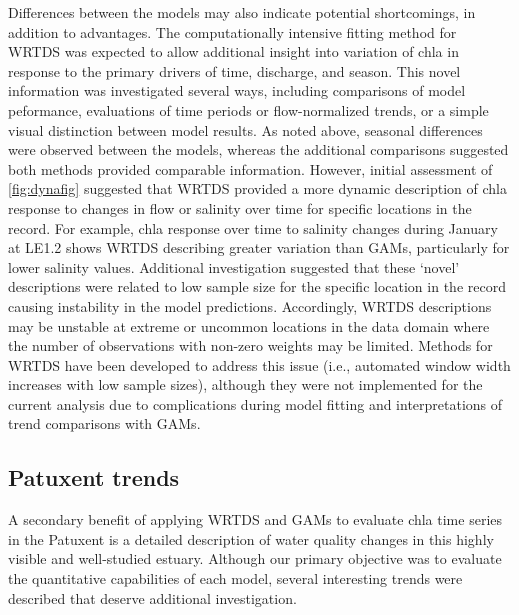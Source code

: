 \documentclass[letterpaper,12pt,oneside]{article}\usepackage[]{graphicx}\usepackage[]{color}
\begin{document}
Differences between the models may also indicate potential shortcomings, in addition to advantages.  The computationally intensive fitting method for \ac{WRTDS} was expected to allow additional insight into variation of \ac{chla} in response to the primary drivers of time, discharge, and season.  This novel information was investigated several ways, including comparisons of model peformance, evaluations of time periods or flow-normalized trends, or a simple visual distinction between model results.  As noted above, seasonal differences were observed between the models, whereas the additional comparisons suggested both methods provided comparable information.  However, initial assessment of \cref{fig:dynafig} suggested that \ac{WRTDS} provided a more dynamic description of \ac{chla} response to changes in flow or salinity over time for specific locations in the record.  For example, \ac{chla} response over time to salinity changes during January at LE1.2 shows \ac{WRTDS} describing greater variation than \acp{GAM}, particularly for lower salinity values.  Additional investigation suggested that these `novel' descriptions were related to low sample size for the specific location in the record causing instability in the model predictions.   Accordingly, \ac{WRTDS} descriptions may be unstable at extreme or uncommon locations in the data domain where the number of observations with non-zero weights may be limited.  Methods for \ac{WRTDS} have been developed to address this issue (i.e., automated window width increases with low sample sizes), although they were not implemented for the current analysis due to complications during model fitting and interpretations of trend comparisons with \acp{GAM}.    

\subsection{Patuxent trends}

A secondary benefit of applying \ac{WRTDS} and \acp{GAM} to evaluate \ac{chla} time series in the Patuxent is a detailed description of water quality changes in this highly visible and well-studied estuary.  Although our primary objective was to evaluate the quantitative capabilities of each model, several interesting trends were described that deserve additional investigation.   

\end{document}
